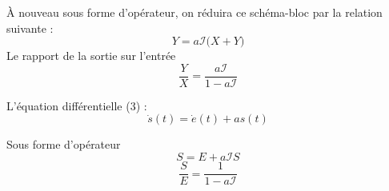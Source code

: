 \begin{center}
    
\end{center}
À nouveau sous forme d'opérateur, on réduira ce schéma-bloc par la relation suivante :
\[
    Y=a\mathcal{I}\big(X+Y\big)
\]
Le rapport de la sortie sur l'entrée
\[
    \dfrac{Y}{X}=\dfrac{a\mathcal{I}}{1-a\mathcal{I}}
\]

L'équation différentielle (3) :
\[
    \dot{s}(t)=\dot{e}(t)+as(t)
\]
\begin{center}
    
\end{center}
Sous forme d'opérateur
\[
    S=E+a\mathcal{I}S
\]
\[
    \dfrac{S}{E}=\dfrac{1}{1-a\mathcal{I}}
\]
